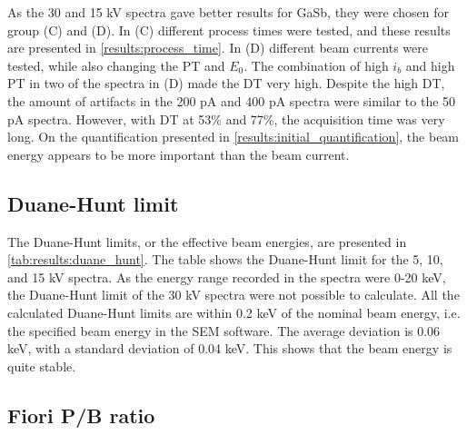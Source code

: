 As the 30 and 15 kV spectra gave better results for GaSb, they were chosen for group (C) and (D).
In (C) different process times were tested, and these results are presented in \cref{results:process_time}.
In (D) different beam currents were tested, while also changing the PT and $E_0$.
The combination of high $i_b$ and high PT in two of the spectra in (D) made the DT very high.
Despite the high DT, the amount of artifacts in the 200 pA and 400 pA spectra were similar to the 50 pA spectra.
However, with DT at 53\% and 77\%, the acquisition time was very long.
On the quantification presented in \cref{results:initial_quantification}, the beam energy appears to be more important than the beam current.








\subsection{Duane-Hunt limit}
\label{results:duane_hunt}

The Duane-Hunt limits, or the effective beam energies, are presented in \cref{tab:results:duane_hunt}.
The table shows the Duane-Hunt limit for the 5, 10, and 15 kV spectra.
As the energy range recorded in the spectra were 0-20 keV, the Duane-Hunt limit of the 30 kV spectra were not possible to calculate.
All the calculated Duane-Hunt limits are within 0.2 keV of the nominal beam energy, i.e. the specified beam energy in the SEM software.
The average deviation is 0.06 keV, with a standard deviation of 0.04 keV.
This shows that the beam energy is quite stable.





\subsection{Fiori P/B ratio}
\label{results:fiori}

